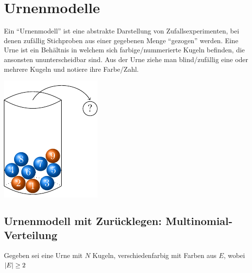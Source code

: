 \section{Urnenmodelle}

Ein ``Urnenmodell'' ist eine abstrakte Darstellung von Zufallsexperimenten, bei denen zufällig Stichproben aus einer gegebenen Menge ``gezogen'' werden.
Eine Urne ist ein Behältnis in welchem sich farbige/nummerierte Kugeln befinden, die ansonsten ununterscheidbar sind.
Aus der Urne ziehe man blind/zufällig eine oder mehrere Kugeln und notiere ihre Farbe/Zahl.

\begin{center}
    \includegraphics{./stoch_abbildungen/urne_mit_kugeln.pdf}
\end{center}

\subsection{Urnenmodell mit Zurücklegen: Multinomial-Verteilung}

Gegeben sei eine Urne mit $N$ Kugeln, verschiedenfarbig mit Farben aus $E$, wobei $\left| E \right| \ge 2$ 

